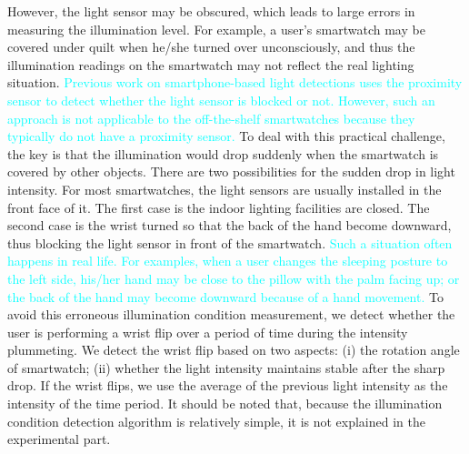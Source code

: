 However, the light sensor may be obscured, which leads to large errors in measuring the illumination level. For example, a user's
smartwatch may be covered under quilt when he/she turned over unconsciously, and thus the illumination readings on the smartwatch may not
reflect the real lighting situation. \textcolor{cyan}{Previous work on smartphone-based light detections uses the proximity sensor
\FIXME{\cite{}} to detect whether the light sensor is blocked or not. However, such an approach is not applicable to the off-the-shelf
smartwatches because they typically do not have a proximity sensor.} To deal with this practical challenge, the key is that the
illumination would drop suddenly when the smartwatch is covered by other objects. There are two possibilities for the sudden drop in light
intensity. For most smartwatches, the light sensors are usually installed in the front face of it. The first case is the indoor lighting
facilities are closed. The second case is the wrist turned so that the back of the hand become downward, thus blocking the light sensor in
front of the smartwatch. \textcolor{cyan}{Such a situation often happens in real life. For examples, when a user changes the sleeping
posture to the left side, his/her hand may be close to the pillow with the palm facing up; or the back of the hand may become downward
because of a hand movement.} To avoid this erroneous illumination condition measurement, we detect whether the user is performing a wrist
flip over a period of time during the intensity plummeting. We detect the wrist flip based on two aspects: (i) the rotation angle of
smartwatch; (ii) whether the light intensity maintains stable after the sharp drop. If the wrist flips, we use the average of the previous
light intensity as the intensity of the time period. It should be noted that, because the illumination condition detection algorithm is
relatively simple, it is not explained in the experimental part.

